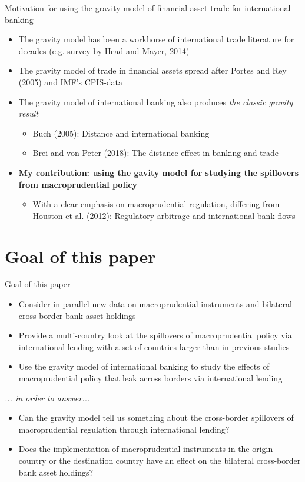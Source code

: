 \documentclass{beamer}
\begin{document}
\begin{frame}{Motivation for using the gravity model of financial asset trade for international banking}
\begin{itemize}
\item The gravity model has been a workhorse of international trade literature for decades (e.g. survey by Head and Mayer, 2014)
\item The gravity model of trade in financial assets spread after Portes and Rey (2005) and IMF's CPIS-data
\item The gravity model of international banking also produces \textit{the classic gravity result}
\begin{itemize}
\item Buch (2005): Distance and international banking
\item Brei and von Peter (2018): The distance effect in banking and trade
\end{itemize}
\item \textbf{My contribution: using the gavity model for studying the spillovers from macroprudential policy}
\begin{itemize}
\item With a clear emphasis on macroprudential regulation, differing from Houston et al. (2012): Regulatory arbitrage and international bank flows
\end{itemize}
\end{itemize}
\end{frame}


\section{Goal of this paper}


\begin{frame}{Goal of this paper}
\begin{itemize}
\item Consider in parallel new data on macroprudential instruments and bilateral cross-border bank asset holdings
\item Provide a multi-country look at the spillovers of macroprudential policy via international lending with a set of countries larger than in previous studies
\item Use the gravity model of international banking to study the effects of macroprudential policy that leak across borders via international lending
\end{itemize}
\textit{... in order to answer...}
\begin{itemize}
\item Can the gravity model tell us something about the cross-border spillovers of macroprudential regulation through international lending?
\item Does the implementation of macroprudential instruments in the origin country or the destination country have an effect on the bilateral cross-border bank asset holdings?
\end{itemize}
\end{frame}
\end{document}
